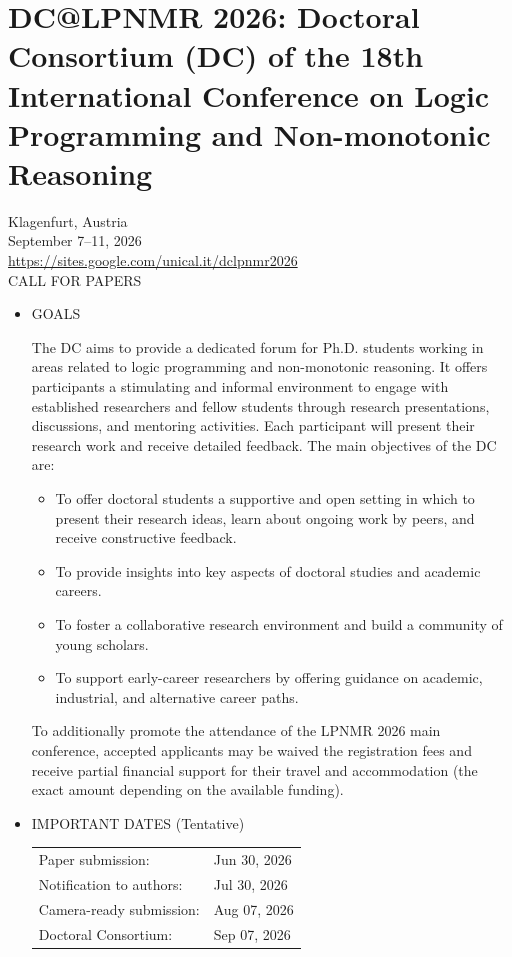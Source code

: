 \documentclass[prodmode,acmtecs]{acmsmall} %
\begin{document}
\section{DC@LPNMR 2026: Doctoral Consortium (DC) of the 18th International Conference on Logic Programming and Non-monotonic Reasoning }\label{DCLPNMR2026}  Klagenfurt, Austria \\ 
  September 7–11, 2026\\ 
  \href{https://sites.google.com/unical.it/dclpnmr2026}{https://sites.google.com/unical.it/dclpnmr2026}\\ 
CALL FOR PAPERS 

\begin{itemize}\item  GOALS 
 
  The DC aims to provide a dedicated forum for Ph.D. students working in areas related to logic programming and non-monotonic reasoning. It offers participants a stimulating and informal environment to engage with established researchers and fellow students through research presentations, discussions, and mentoring activities. Each participant will present their research work and receive detailed feedback. The main objectives of the DC are: 
 
\begin{itemize}\item  To offer doctoral students a supportive and open setting in which to present their research ideas, learn about ongoing work by peers, and receive constructive feedback.
\item  To provide insights into key aspects of doctoral studies and academic careers.
\item  To foster a collaborative research environment and build a community of young scholars.
\item  To support early-career researchers by offering guidance on academic, industrial, and alternative career paths.
\end{itemize} 
  To additionally promote the attendance of the LPNMR 2026 main conference, accepted applicants may be waived the registration fees and receive partial financial support for their travel and accommodation (the exact amount depending on the available funding). 
 
\item  IMPORTANT DATES (Tentative) 
 
\begin{tabulary}{\linewidth}{LL}Paper submission:  & Jun 30, 2026 \\
Notification to authors:  & Jul 30, 2026 \\
Camera-ready submission:  & Aug 07, 2026 \\
Doctoral Consortium:  & Sep 07, 2026 \\
\end{tabulary}
 

\end{itemize}
\end{document}
